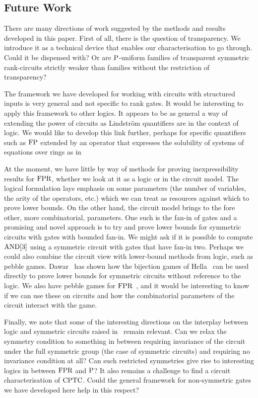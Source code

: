 \documentclass[a4paper,UKenglish]{lipics-v2018}
\begin{document}
\subsection*{Future Work}
There are many directions of work suggested by the methods and results developed
in this paper. First of all, there is the question of transparency. We introduce
it as a technical device that enables our characterisation to go through. Could
it be dispensed with? Or are $\mathrm{P}$-uniform families of transparent symmetric
rank-circuits strictly weaker than families without the restriction of
transparency?

The framework we have developed for working with circuits with structured inputs
is very general and not specific to rank gates. It would be interesting to apply
this framework to other logics. It appears to be as general a way of extending
the power of circuits as Lindstr\"om quantifiers are in the context of logic. We
would like to develop this link further, perhaps for specific quantifiers such
as $\text{\upshape FP}$ extended by an operator that expresses the solubility of systems of
equations over rings as in~\cite{DGHKP}

At the moment, we have little by way of methods for proving inexpressibility
results for $\text{\upshape FPR}$, whether we look at it as a logic or in the circuit model.
The logical formulation lays emphasis on some parameters (the number of
variables, the arity of the operators, etc.) which we can treat as resources
against which to prove lower bounds. On the other hand, the circuit model brings
to the fore other, more combinatorial, parameters. One such is the fan-in of
gates and a promising and novel approach is to try and prove lower bounds for
symmetric circuits with gates with bounded fan-in. We might ask if it is
possible to compute $\text{\upshape AND}[3]$ using a symmetric circuit with gates that have
fan-in two. Perhaps we could also combine the circuit view with lower-bound
methods from logic, such as pebble games. Dawar~\cite{Dawar2016} has shown how
the bijection games of Hella~\cite{Hella19961} can be used directly to prove
lower bounds for symmetric circuits without reference to the logic. We also have
pebble games for $\text{\upshape FPR}$~\cite{DawarH2012}, and it would be interesting to know
if we can use these on circuits and how the combinatorial parameters of the
circuit interact with the game.

Finally, we note that some of the interesting directions on the interplay
between logic and symmetric circuits raised in~\cite{AndersonD17} remain
relevant. Can we relax the symmetry condition to something in between requiring
invariance of the circuit under the full symmetric group (the case of symmetric
circuits) and requiring no invariance condition at all? Can such restricted
symmetries give rise to interesting logics in between $\text{\upshape FPR}$ and $\mathrm{P}$? It also
remains a challenge to find a circuit characterisation of $\text{\upshape CPTC}$. Could the
general framework for non-symmetric gates we have developed here help in this
respect?



% 
\end{document}
